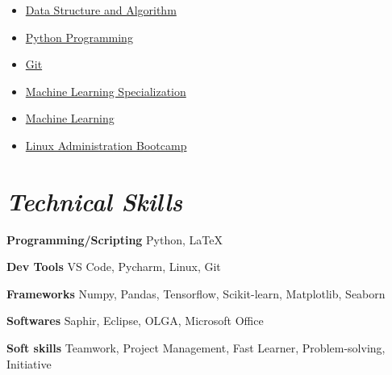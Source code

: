 \documentclass[a4paper, 11pt, sans]{article}
\newcommand*{\authorimg}[1]{%
	\raisebox{-.3\baselineskip}{%
		\texttt{[image: \#1]}%
	}%
}
\newcommand{\bluesection}[1]{
	\textcolor{navyblue}{\textit{#1}}
}
\begin{document}
\begin{multicols}{2}
	\begin{itemize}[itemsep=1pt, parsep=5pt]
		\item\small \authorimg{images/ds-algorithm.png} \href{https://maktabkhooneh.org/course/189-%D8%B7%D8%B1%D8%A7%D8%AD%DB%8C-%D8%A7%D9%84%DA%AF%D9%88%D8%B1%DB%8C%D8%AA%D9%85-mk189/}{Data Structure and Algorithm}
		\item \authorimg{images/python.png} \href{https://www.pytopia.ai/course/python}{Python Programming}
		\item \authorimg{images/git.png} \href{https://www.pytopia.ai/course/git}{Git}
		\item \authorimg{images/ml.png} \href{https://www.coursera.org/specializations/machine-learning-introduction}{Machine Learning Specialization}
		\item \authorimg{images/ml-logo.png} \href{https://www.pytopia.ai/course/ml}{Machine Learning}
		\item \authorimg{images/ubuntu.jpg} \href{https://www.udemy.com/course/linux-administration-bootcamp/}{Linux Administration Bootcamp}
	\end{itemize}
\end{multicols}
\vspace*{1.0\multicolsep}


\vspace{3pt}
\section{\bluesection{Technical Skills}}
\begin{itemize}[leftmargin=0.15in, label={}]
	\small{\item{
			\textbf{Programming/Scripting} \hspace*{.98cm}{:}\hspace*{0.5cm} {Python, \LaTeX}}
		\item{
			\textbf{Dev Tools} \hspace*{3.2cm}{:}\hspace*{0.5cm} {VS Code, Pycharm, Linux, Git}
		}
		\item{
			\textbf{Frameworks} \hspace*{2.75cm}{:}\hspace*{0.5cm} {Numpy, Pandas, Tensorflow, Scikit-learn, Matplotlib, Seaborn} 
		}
		\item{
			\textbf{Softwares} \hspace*{3.12cm}{:}\hspace*{0.5cm} {Saphir, Eclipse, OLGA, Microsoft Office} 
		}
	\item{
			\textbf{Soft skills} \hspace*{3.18cm}{:}\hspace*{0.5cm} {Teamwork, Project Management, Fast Learner, Problem-solving, Initiative}
		}
	
}
\end{itemize}	
\vspace{-10pt}
\end{document}
